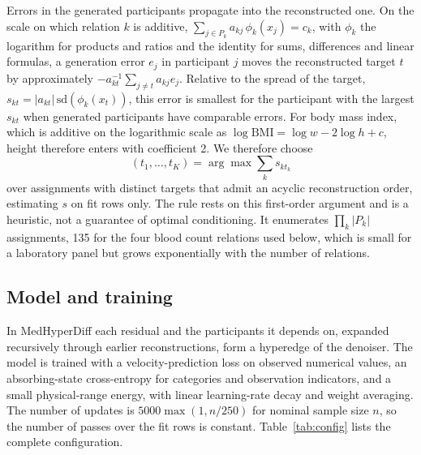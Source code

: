 \documentclass[pdflatex,referee]{sn-jnl}%
\begin{document}
Errors in the generated participants propagate into the reconstructed one. On the scale on which relation $k$ is additive, $\sum_{j \in P_k} a_{kj}\, \phi_k(x_j) = c_k$, with $\phi_k$ the logarithm for products and ratios and the identity for sums, differences and linear formulas, a generation error $e_j$ in participant $j$ moves the reconstructed target $t$ by approximately $-a_{kt}^{-1} \sum_{j \ne t} a_{kj} e_j$. Relative to the spread of the target, $s_{kt} = |a_{kt}|\, \mathrm{sd}(\phi_k(x_t))$, this error is smallest for the participant with the largest $s_{kt}$ when generated participants have comparable errors. For body mass index, which is additive on the logarithmic scale as $\log \mathrm{BMI} = \log w - 2\log h + c$, height therefore enters with coefficient 2. We therefore choose
\begin{equation}
(t_1, \dots, t_K) = \arg\max \textstyle\sum_{k} s_{k t_k}
\label{eq:choice}
\end{equation}
over assignments with distinct targets that admit an acyclic reconstruction order, estimating $s$ on fit rows only. The rule rests on this first-order argument and is a heuristic, not a guarantee of optimal conditioning. It enumerates $\prod_k |P_k|$ assignments, 135 for the four blood count relations used below, which is small for a laboratory panel but grows exponentially with the number of relations.

\subsection*{Model and training}

In MedHyperDiff each residual and the participants it depends on, expanded recursively through earlier reconstructions, form a hyperedge of the denoiser. The model is trained with a velocity-prediction loss on observed numerical values, an absorbing-state cross-entropy for categories and observation indicators, and a small physical-range energy, with linear learning-rate decay and weight averaging. The number of updates is $5000 \max(1, n/250)$ for nominal sample size $n$, so the number of passes over the fit rows is constant. Table~\ref{tab:config} lists the complete configuration.
\end{document}
